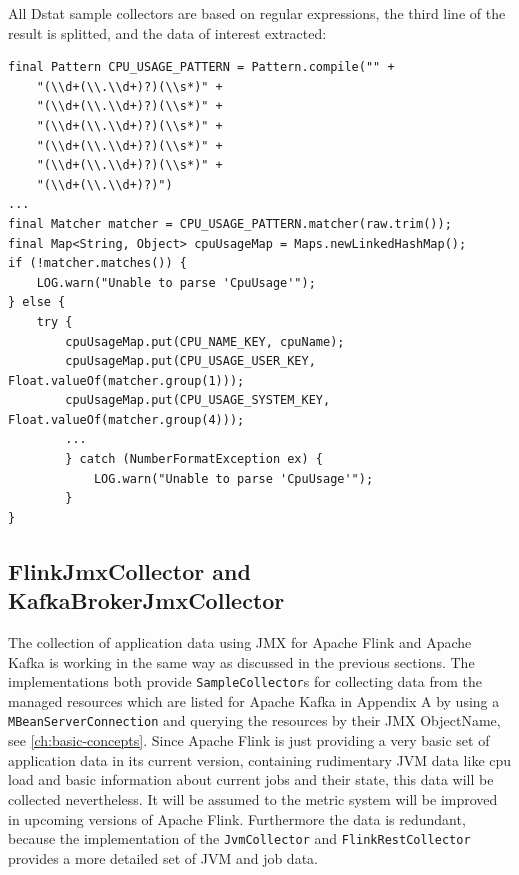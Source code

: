 All Dstat sample collectors are based on regular expressions, the third line of the result is splitted, and the data of interest
extracted:
\begin{lstlisting}[caption={"CpuSampleCollector", Extract sample data}, captionpos=b, label={lst:cpusamplecollector}]
final Pattern CPU_USAGE_PATTERN = Pattern.compile("" +
    "(\\d+(\\.\\d+)?)(\\s*)" +
    "(\\d+(\\.\\d+)?)(\\s*)" +
    "(\\d+(\\.\\d+)?)(\\s*)" +
    "(\\d+(\\.\\d+)?)(\\s*)" +
    "(\\d+(\\.\\d+)?)(\\s*)" +
    "(\\d+(\\.\\d+)?)")
...
final Matcher matcher = CPU_USAGE_PATTERN.matcher(raw.trim());
final Map<String, Object> cpuUsageMap = Maps.newLinkedHashMap();
if (!matcher.matches()) {
    LOG.warn("Unable to parse 'CpuUsage'");
} else {
    try {
        cpuUsageMap.put(CPU_NAME_KEY, cpuName);
        cpuUsageMap.put(CPU_USAGE_USER_KEY, Float.valueOf(matcher.group(1)));
        cpuUsageMap.put(CPU_USAGE_SYSTEM_KEY, Float.valueOf(matcher.group(4)));
        ...
        } catch (NumberFormatException ex) {
            LOG.warn("Unable to parse 'CpuUsage'");
        }
}
\end{lstlisting}

\subsection{FlinkJmxCollector and KafkaBrokerJmxCollector}

The collection of application data using JMX for Apache Flink and Apache Kafka is working in the
same way as discussed in the previous sections. The implementations both provide \verb|SampleCollector|s for collecting data
from the managed resources which are listed for Apache Kafka in Appendix A by using a \verb|MBeanServerConnection| and querying the resources by their JMX ObjectName,
see \autoref{ch:basic-concepts}. Since Apache Flink is just providing a very basic set
of application data in its current version, containing rudimentary JVM data like cpu load and basic information about current
jobs and their state, this data will be collected nevertheless. It will be assumed to the metric system will be improved in upcoming versions
of Apache Flink. Furthermore the data is redundant, because the implementation of the \verb|JvmCollector| and \verb|FlinkRestCollector| provides a
more detailed set of JVM and job data.

